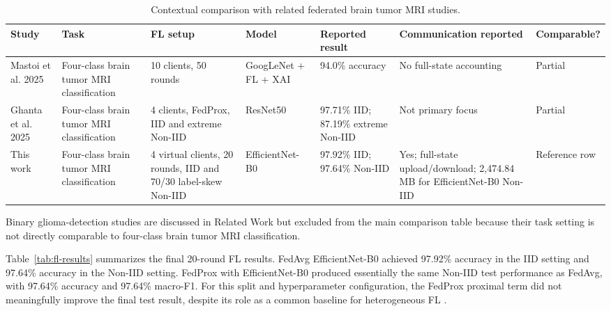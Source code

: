 \documentclass[10pt,twocolumn]{article}
\begin{document}
\begin{table}[t]
\centering
\caption{Contextual comparison with related federated brain tumor MRI studies.}
\label{tab:context-comparison}
\scriptsize
\setlength{\tabcolsep}{2.5pt}
\renewcommand{\arraystretch}{1.08}
\begin{tabularx}{\textwidth}{@{}L{1.75cm}Y Y L{1.85cm}Y Y L{1.7cm}@{}}
\toprule
Study & Task & FL setup & Model & Reported result & Communication reported & Comparable? \\
\midrule
Mastoi et al. 2025 \cite{mastoi2025explainable} & Four-class brain tumor MRI classification & 10 clients, 50 rounds & GoogLeNet + FL + XAI & 94.0\% accuracy & No full-state accounting & Partial \\
Ghanta et al. 2025 \cite{ghanta2025federated} & Four-class brain tumor MRI classification & 4 clients, FedProx, IID and extreme Non-IID & ResNet50 & 97.71\% IID; 87.19\% extreme Non-IID & Not primary focus & Partial \\
This work & Four-class brain tumor MRI classification & 4 virtual clients, 20 rounds, IID and 70/30 label-skew Non-IID & EfficientNet-B0 & 97.92\% IID; 97.64\% Non-IID & Yes; full-state upload/download; 2,474.84 MB for EfficientNet-B0 Non-IID & Reference row \\
\bottomrule
\end{tabularx}
\end{table}

Binary glioma-detection studies are discussed in Related Work but excluded from the main comparison table because their task setting is not directly comparable to four-class brain tumor MRI classification.

Table~\ref{tab:fl-results} summarizes the final 20-round FL results. FedAvg EfficientNet-B0 achieved 97.92\% accuracy in the IID setting and 97.64\% accuracy in the Non-IID setting. FedProx with EfficientNet-B0 produced essentially the same Non-IID test performance as FedAvg, with 97.64\% accuracy and 97.64\% macro-F1. For this split and hyperparameter configuration, the FedProx proximal term did not meaningfully improve the final test result, despite its role as a common baseline for heterogeneous FL \cite{li2020fedprox,ghanta2025federated}.
\end{document}
